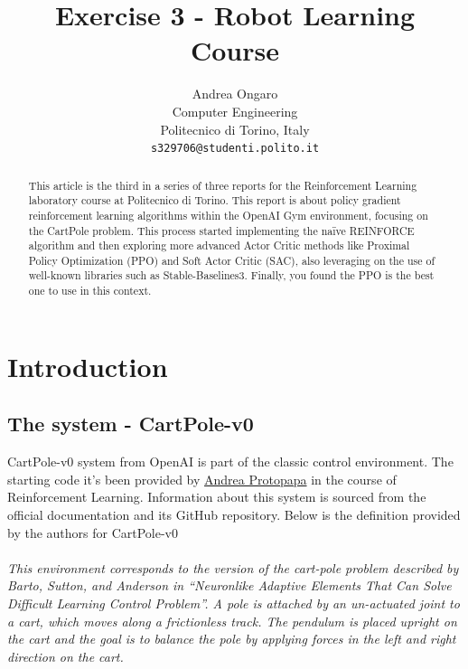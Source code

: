 \documentclass{article}
\title{Exercise 3 - Robot Learning Course}
\author{
  Andrea Ongaro\\
	Computer Engineering\\
	Politecnico di Torino, Italy\\
	\texttt{s329706@studenti.polito.it} \\
}
\begin{document}
\maketitle


\begin{abstract}
This article is the third in a series of three reports for the Reinforcement Learning laboratory course at Politecnico di Torino. This report is about policy gradient reinforcement learning algorithms within the OpenAI Gym environment, focusing on the CartPole problem. This process started implementing the naïve REINFORCE algorithm and then exploring more advanced Actor Critic methods like Proximal Policy Optimization (PPO) and Soft Actor Critic (SAC), also leveraging on the use of well-known
libraries such as Stable-Baselines3. Finally, you found the PPO is the best one to use in this context.

\end{abstract}



\section{Introduction}
\subsection{The system - CartPole-v0}
CartPole-v0 system from OpenAI is part of the classic control environment. The starting code it's been provided by \href{https://www.polito.it/personale?p=andrea.protopapa}{Andrea Protopapa} in the course of Reinforcement Learning. Information about this system is sourced from the official documentation \cite{Cart_pole} and its GitHub repository. Below is the definition provided by the authors for CartPole-v0\\ \\
\textit{This environment corresponds to the version of the cart-pole problem described by Barto, Sutton, and Anderson in “Neuronlike Adaptive Elements That Can Solve Difficult Learning Control Problem”. A pole is attached by an un-actuated joint to a cart, which moves along a frictionless track. The pendulum is placed upright on the cart and the goal is to balance the pole by applying forces in the left and right direction on the cart.\citep{Cart_pole}}
\end{document}
